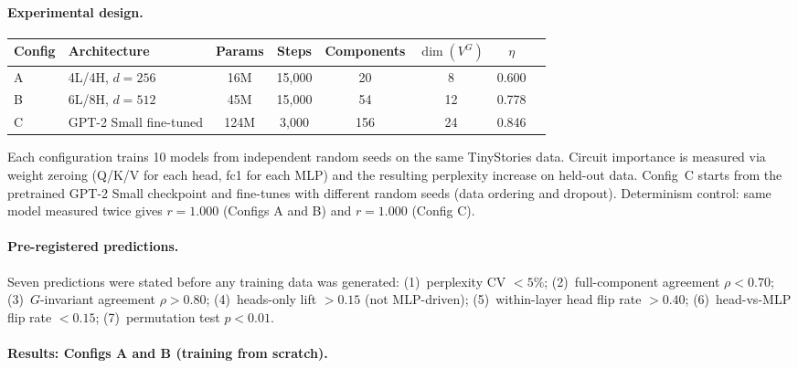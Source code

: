 \documentclass[11pt,a4paper]{article}
\begin{document}
\paragraph{Experimental design.}
\begin{center}
\small
\begin{tabular}{@{}llcccccc@{}}
\toprule
Config & Architecture & Params & Steps & Components & $\dim(V^G)$ & $\eta$ \\
\midrule
A & 4L/4H, $d = 256$ & 16M & 15{,}000 & 20 & 8 & 0.600 \\
B & 6L/8H, $d = 512$ & 45M & 15{,}000 & 54 & 12 & 0.778 \\
C & GPT-2 Small fine-tuned & 124M & 3{,}000 & 156 & 24 & 0.846 \\
\bottomrule
\end{tabular}
\end{center}
Each configuration trains 10 models from independent random seeds on the same TinyStories data.  Circuit importance is measured via weight zeroing (Q/K/V for each head, fc1 for each MLP) and the resulting perplexity increase on held-out data.  Config~C starts from the pretrained GPT-2 Small checkpoint and fine-tunes with different random seeds (data ordering and dropout).  Determinism control: same model measured twice gives $r = 1.000$ (Configs A and B) and $r = 1.000$ (Config C).

\paragraph{Pre-registered predictions.}
Seven predictions were stated before any training data was generated:
(1)~perplexity CV $< 5\%$;
(2)~full-component agreement $\rho < 0.70$;
(3)~$G$-invariant agreement $\rho > 0.80$;
(4)~heads-only lift $> 0.15$ (not MLP-driven);
(5)~within-layer head flip rate $> 0.40$;
(6)~head-vs-MLP flip rate $< 0.15$;
(7)~permutation test $p < 0.01$.

\paragraph{Results: Configs A and B (training from scratch).}
\end{document}
